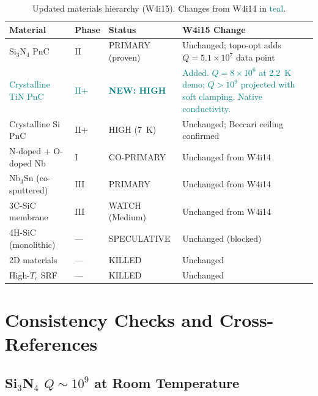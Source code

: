 \documentclass[11pt]{article}
\theoremstyle{definition}
\theoremstyle{remark}
\newcommand{\ee}[1]{\times 10^{#1}}
\begin{document}
\begin{table}[H]
\centering
\caption{Updated materials hierarchy (W4i15). Changes from W4i14
in \textcolor{teal}{teal}.}
\label{tab:hierarchy}
\renewcommand{\arraystretch}{1.3}
\begin{tabular}{p{3.5cm}p{2cm}p{2.5cm}p{4cm}}
\toprule
\textbf{Material} & \textbf{Phase} & \textbf{Status} &
\textbf{W4i15 Change} \\
\midrule
Si$_3$N$_4$ PnC & II & PRIMARY (proven) & Unchanged; topo-opt
  adds $Q = 5.1\ee{7}$ data point \\
\midrule
\textcolor{teal}{Crystalline TiN PnC} & \textcolor{teal}{II+} &
  \textcolor{teal}{\textbf{NEW: HIGH}} & \textcolor{teal}{Added.
  $Q = 8\ee{6}$ at 2.2~K demo; $Q > 10^9$ projected with soft
  clamping. Native conductivity.} \\
\midrule
Crystalline Si PnC & II+ & HIGH (7~K) & Unchanged; Beccari
  ceiling confirmed \\
\midrule
N-doped + O-doped Nb & I & CO-PRIMARY & Unchanged from W4i14 \\
\midrule
Nb$_3$Sn (co-sputtered) & III & PRIMARY & Unchanged from W4i14 \\
\midrule
3C-SiC membrane & III & WATCH (Medium) & Unchanged from W4i14 \\
\midrule
4H-SiC (monolithic) & --- & SPECULATIVE & Unchanged (blocked) \\
\midrule
2D materials & --- & KILLED & Unchanged \\
\midrule
High-$T_c$ SRF & --- & KILLED & Unchanged \\
\bottomrule
\end{tabular}
\end{table}


\section{Consistency Checks and Cross-References}
\label{sec:consistency}

\subsection{Si$_3$N$_4$ $Q \sim 10^9$ at Room Temperature}
\end{document}
